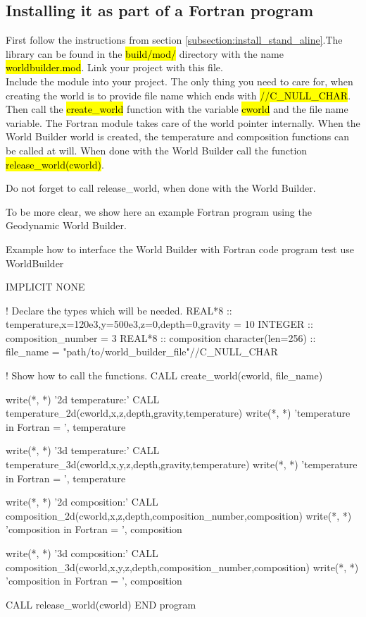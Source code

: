 \documentclass{book}
\newcommand{\GWB}{{Geodynamic World Builder}}
\newcommand{\WB}{{World Builder}}
\begin{document}
\subsection{Installing it as part of a Fortran program}
First follow the instructions from section \ref{subsection:install_stand_aline}.The library can be found in the \hl{build/mod/} directory with the name \hl{worldbuilder.mod}. Link your project with this file. 
\\
Include the module into your project. The only thing you need to care for, when creating the world is to provide file name which ends with \hl{//C\_NULL\_CHAR}. Then call the \hl{create\_world} function with the variable \hl{cworld} and the file name variable. The Fortran module takes care of the world pointer internally. When the \WB{} world is created, the temperature and composition functions can be called at will. When done with the \WB{} call the function \hl{release\_world(cworld)}. 
\begin{remark}
Do not forget to call release\_world, when done with the \WB{}.
\end{remark}
To be more clear, we show here an example Fortran program using the \GWB{}. 

\begin{fortrancode}{Example how to interface the \WB{} with Fortran code}
program test
use WorldBuilder

IMPLICIT NONE

  ! Declare the types which will be needed.
  REAL*8 :: temperature,x=120e3,y=500e3,z=0,depth=0,gravity = 10
  INTEGER :: composition_number = 3
  REAL*8 :: composition
  character(len=256) :: file_name = "path/to/world_builder_file"//C_NULL_CHAR

  ! Show how to call the functions.
  CALL create_world(cworld, file_name)

  write(*, *) '2d temperature:'
  CALL temperature_2d(cworld,x,z,depth,gravity,temperature)
  write(*, *) 'temperature in Fortran = ', temperature

  write(*, *) '3d temperature:'
  CALL temperature_3d(cworld,x,y,z,depth,gravity,temperature)
  write(*, *) 'temperature in Fortran = ', temperature

    write(*, *) '2d composition:'
  CALL composition_2d(cworld,x,z,depth,composition_number,composition)
  write(*, *) 'composition in Fortran = ', composition

  write(*, *) '3d composition:'
  CALL composition_3d(cworld,x,y,z,depth,composition_number,composition)
  write(*, *) 'composition in Fortran = ', composition

  CALL release_world(cworld)
END program
\end{fortrancode}
\end{document}
